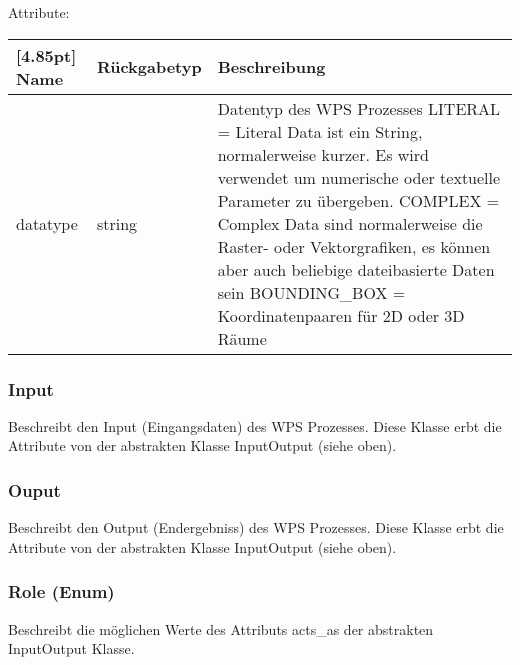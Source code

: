 			Attribute:
			\begin{center}
				\setlength\tabcolsep{5pt}
				\renewcommand{\arraystretch}{1.5}
				
				\begin{tabularx}{\textwidth}{|l|l|X|}
					\hline
					\rowcolor[gray]{0.75}[4.85pt]
					Name & Rückgabetyp & Beschreibung \\ \hline 
	           		datatype & string & Datentyp des WPS Prozesses\newline
	           		LITERAL =  Literal Data ist ein String, normalerweise kurzer. Es wird verwendet um numerische oder textuelle Parameter zu übergeben.   \newline
	           		COMPLEX = Complex Data sind normalerweise die Raster- oder Vektorgrafiken, es können aber auch beliebige dateibasierte Daten sein\newline 
	           		BOUNDING_BOX = Koordinatenpaaren für 2D oder 3D Räume \\ \hline
				\end{tabularx}
			\end{center}

    	\subsubsection{Input}
			Beschreibt den Input (Eingangsdaten) des WPS Prozesses. \newline
			Diese Klasse erbt die Attribute von der abstrakten Klasse InputOutput (siehe oben).

        \subsubsection{Ouput}
			Beschreibt den Output (Endergebniss) des WPS Prozesses. \newline
			Diese Klasse erbt die Attribute von der abstrakten Klasse InputOutput (siehe oben).
 
		\subsubsection{Role (Enum)}
			Beschreibt die möglichen Werte des Attributs acts\_as der abstrakten InputOutput Klasse. \newline
			
